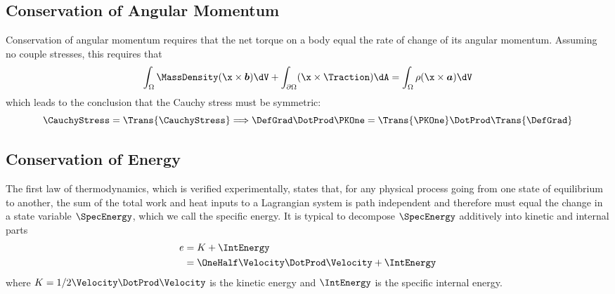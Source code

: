 \documentclass[10pt]{article}
\begin{document}
\subsection{Conservation of Angular Momentum}
Conservation of angular momentum requires that the net torque on a body equal the
rate of change of its angular momentum. Assuming no couple stresses, this
requires that
%
\begin{equation}
  \label{eq:ang.momentum}
  \int_{\Omega}\MassDensity(\x\times\boldsymbol{b})\dV
  + \int_{\partial \Omega}(\x\times\Traction)\dA
  = \int_{\Omega}\rho(\x\times\boldsymbol{a})\dV
\end{equation}
%
which leads to the conclusion that the Cauchy stress must be symmetric:
%
\begin{equation}
  \label{eq:cauchy.symmetric}
  \CauchyStress = \Trans{\CauchyStress}
  \Longrightarrow
  \DefGrad\DotProd\PKOne=\Trans{\PKOne}\DotProd\Trans{\DefGrad}
\end{equation}

\subsection{Conservation of Energy}
The first law of thermodynamics, which is verified experimentally, states that, for any physical process going from one state of equilibrium to another, the sum of the total work and heat inputs to a Lagrangian system is path independent and therefore must equal the change in a state variable $\SpecEnergy$, which we call the specific energy. It is typical to decompose $\SpecEnergy$ additively into kinetic and internal parts
%
\begin{align}
  \nonumber
  e &= K + \IntEnergy \\
  \label{eq:specenergyrelat}
  &= \OneHalf\Velocity\DotProd\Velocity + \IntEnergy
\end{align}
%
where $K=1/2\Velocity\DotProd\Velocity$ is the kinetic energy and $\IntEnergy$ is the specific
internal energy.
\end{document}
